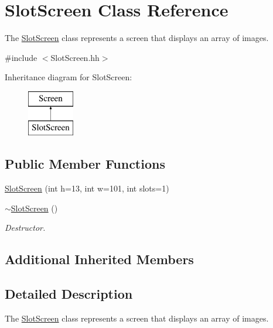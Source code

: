 \hypertarget{classSlotScreen}{\section{Slot\-Screen Class Reference}
\label{classSlotScreen}
}


The \hyperlink{classSlotScreen}{Slot\-Screen} class represents a screen that displays an array of images.  




{\ttfamily \#include $<$Slot\-Screen.\-hh$>$}

Inheritance diagram for Slot\-Screen\-:\begin{figure}[H]
\begin{center}
\leavevmode
\includegraphics[height=2.000000cm]{classSlotScreen}
\end{center}
\end{figure}
\subsection*{Public Member Functions}
\begin{DoxyCompactItemize}
\item 
\hyperlink{classSlotScreen_a55b2a1537eb5cf4735f624e50946bc5a}{Slot\-Screen} (int h=13, int w=101, int slots=1)
\item 
\hypertarget{classSlotScreen_a1978a574c2835aeafd746ff3813c7253}{\hyperlink{classSlotScreen_a1978a574c2835aeafd746ff3813c7253}{$\sim$\-Slot\-Screen} ()}\label{classSlotScreen_a1978a574c2835aeafd746ff3813c7253}

\begin{DoxyCompactList}\small\item\em Destructor. \end{DoxyCompactList}\end{DoxyCompactItemize}
\subsection*{Additional Inherited Members}


\subsection{Detailed Description}
The \hyperlink{classSlotScreen}{Slot\-Screen} class represents a screen that displays an array of images. 

